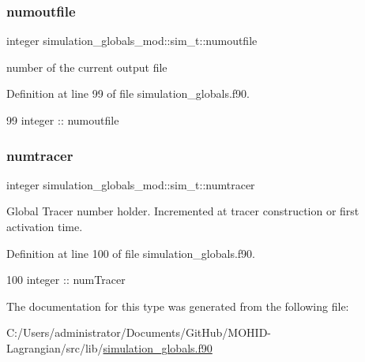 \subsubsection{\texorpdfstring{numoutfile}{numoutfile}}
{\footnotesize\ttfamily integer simulation\+\_\+globals\+\_\+mod\+::sim\+\_\+t\+::numoutfile\hspace{0.3cm}{\ttfamily [private]}}



number of the current output file 



Definition at line 99 of file simulation\+\_\+globals.\+f90.


\begin{DoxyCode}
99         \textcolor{keywordtype}{integer} :: numoutfile
\end{DoxyCode}
\mbox{\label{structsimulation__globals__mod_1_1sim__t_aebab7e606e20096c948d97151a841ff0}} 
\subsubsection{\texorpdfstring{numtracer}{numtracer}}
{\footnotesize\ttfamily integer simulation\+\_\+globals\+\_\+mod\+::sim\+\_\+t\+::numtracer\hspace{0.3cm}{\ttfamily [private]}}



Global Tracer number holder. Incremented at tracer construction or first activation time. 



Definition at line 100 of file simulation\+\_\+globals.\+f90.


\begin{DoxyCode}
100         \textcolor{keywordtype}{integer} :: numTracer
\end{DoxyCode}


The documentation for this type was generated from the following file\+:\begin{DoxyCompactItemize}
\item 
C\+:/\+Users/administrator/\+Documents/\+Git\+Hub/\+M\+O\+H\+I\+D-\/\+Lagrangian/src/lib/\mbox{\hyperlink{simulation__globals_8f90}{simulation\+\_\+globals.\+f90}}\end{DoxyCompactItemize}
